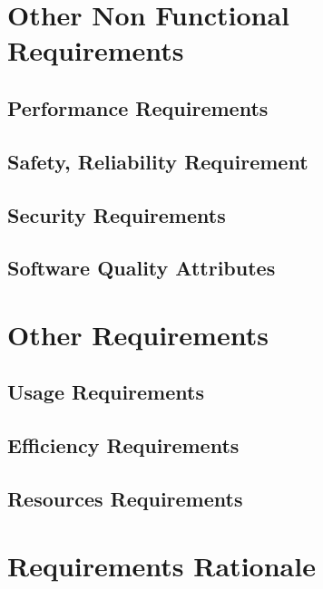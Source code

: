 \documentclass{report}
\begin{document}
	\chapter{Other Non Functional Requirements}
		\section{Performance Requirements}
		\section{Safety, Reliability Requirement}
		\section{Security Requirements}
		\section{Software Quality Attributes}
	\chapter{Other Requirements}
		\section{Usage Requirements}
		\section{Efficiency Requirements}
		\section{Resources Requirements}
	\chapter{Requirements Rationale}
\end{document}

